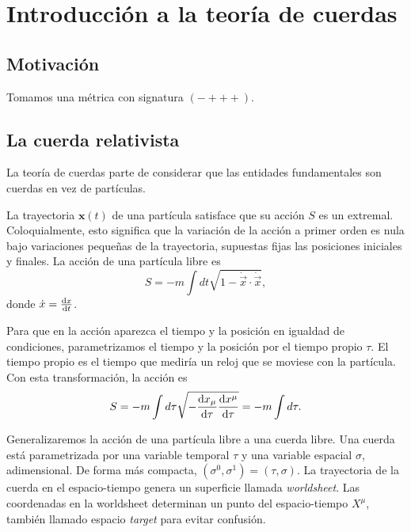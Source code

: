 \chapter{Introducción a la teoría de cuerdas}


\section{Motivación}



Tomamos una métrica con signatura $(-+++)$.

\section{La cuerda relativista}


La teoría de cuerdas parte de considerar que las entidades fundamentales son cuerdas
en vez de partículas. 


La trayectoria $\mathbf x(t)$ de una partícula satisface que su acción $S$ es un extremal.
Coloquialmente, esto significa que la variación de la acción a primer orden es nula bajo
variaciones pequeñas de la trayectoria, supuestas fijas las posiciones iniciales y finales.
La acción de una partícula libre es
\begin{equation}
  S=-m\int dt \sqrt{1-\dot {\vec{x}} \cdot \dot {\vec{x}}},
\end{equation}
donde $\dot x = \dv{x}{t}$.

Para que en la acción aparezca el tiempo y la posición en igualdad de condiciones,
parametrizamos el tiempo y la posición por el tiempo propio $\tau$. 
El tiempo propio es el tiempo que mediría un reloj que se moviese con la partícula.
Con esta transformación, la acción es
\begin{equation}
 S = -m\int d\tau \sqrt{-\dv{x_\mu}{\tau}\dv{x^\mu}{\tau}}=-m\int d\tau .
\end{equation}


Generalizaremos la acción de una partícula libre a una cuerda libre.
Una cuerda está parametrizada por una variable temporal $\tau$ y una variable espacial $\sigma$, adimensional.
De forma más compacta, $(\sigma^0,\sigma^1)=(\tau,\sigma)$. 
La trayectoria de la cuerda en el espacio-tiempo genera un superficie llamada \emph{worldsheet}.
Las coordenadas en la worldsheet determinan un punto del espacio-tiempo $X^\mu$, también llamado
espacio \emph{target} para evitar confusión.

